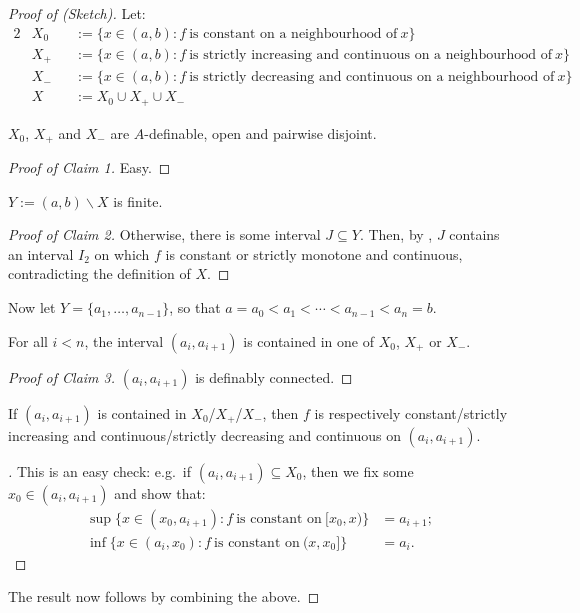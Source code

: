 \documentclass[a4paper]{report}
\makeatletter
\theoremstyle{definition}
\theoremstyle{remstyle}
\newenvironment{claim}[1]
{\renewcommand\theclaiminner{#1}\claiminner}
{\endclaiminner}
\providecommand*{\dashv}{%
	\mathrel{%
		\mathpalette\@dashv\vdash
	}%
}
\newcommand*{\@dashv}[2]{%
	\reflectbox{$\m@th#1#2$}%
}
\newenvironment{subproof}[1][\proofname]{%
	\renewcommand{\qedsymbol}{$\dashv$}%
	\begin{proof}[#1]%
	}{%
	\end{proof}%
}
\makeatother
\begin{document}
\begin{proof}[Proof of  (Sketch)]
	Let:
	\begin{alignat*}{2}
		 & X_0 &  & := \{x\in(a,b):f\ \text{is constant on a neighbourhood of}\ x\}                           \\
		 & X_+ &  & := \{x\in(a,b):f\ \text{is strictly increasing and continuous on a neighbourhood of}\ x\} \\
		 & X_- &  & := \{x\in(a,b):f\ \text{is strictly decreasing and continuous on a neighbourhood of}\ x\} \\
		 & X   &  & := X_0\cup X_+\cup X_-
	\end{alignat*}

	\begin{claim}{1}
		$X_0$, $X_+$ and $X_-$ are $A$-definable, open and pairwise disjoint.
	\end{claim}

	\begin{subproof}[Proof of Claim 1]
		Easy.
	\end{subproof}

	\begin{claim}{2}
		$Y:=(a,b)\backslash X$ is finite.
	\end{claim}

	\begin{subproof}[Proof of Claim 2]
		Otherwise, there is some interval $J\subseteq Y$. Then, by , $J$ contains an interval $I_2$ on which $f$ is constant or strictly monotone and continuous, contradicting the definition of $X$.
	\end{subproof}

	Now let $Y=\{a_1,\ldots,a_{n-1}\}$, so that $a=a_0<a_1<\cdots<a_{n-1}<a_n=b$.

	\begin{claim}{3}
		For all $i<n$, the interval $(a_i,a_{i+1})$ is contained in one of $X_0$, $X_+$ or $X_-$.
	\end{claim}

	\begin{subproof}[Proof of Claim 3]
		$(a_i,a_{i+1})$ is definably connected.
	\end{subproof}

	\begin{claim}{4}
		If $(a_i,a_{i+1})$ is contained in $X_0$/$X_+$/$X_-$, then $f$ is respectively constant/strictly increasing and continuous/strictly decreasing and continuous on $(a_i,a_{i+1})$.
	\end{claim}

	\begin{subproof}
		This is an easy check: e.g.\ if $(a_i,a_{i+1})\subseteq X_0$, then we fix some $x_0\in(a_i,a_{i+1})$ and show that:
		\begin{align*}
			\sup\{x\in(x_0,a_{i+1}):f\ \text{is constant on}\ [x_0,x)\} & =a_{i+1}; \\
			\inf\{x\in(a_i,x_0):f\ \text{is constant on}\ (x,x_0]\}     & =a_i.
		\end{align*}
	\end{subproof}

	The result now follows by combining the above.
\end{proof}
\end{document}
